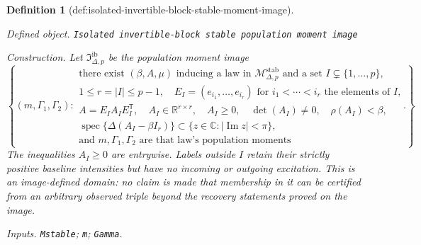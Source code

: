 \documentclass{article}
\newtheorem{definition}{Definition}
\begin{document}
\begin{definition}[def:isolated-invertible-block-stable-moment-image]\label{def:isolated-invertible-block-stable-moment-image}
\par\smallskip\noindent\emph{Defined object.} \texttt{Isolated invertible-\allowbreak{}block stable population moment image}
\par\smallskip\noindent\emph{Construction.} Let \(\mathfrak I_{\Delta,p}^{\mathrm{ib}}\) be the population moment image
\[
 \left\{(m,\Gamma_1,\Gamma_2):\begin{array}{l}
 \text{there exist }(\beta,A,\mu)\text{ inducing a law in }\mathcal M_{\Delta,p}^{\mathrm{stab}}\text{ and a set }I\subsetneq\{1,\ldots,p\},\\
 1\leq r=|I|\leq p-1,\quad E_I=(e_{i_1},\ldots,e_{i_r})\text{ for }i_1<\cdots<i_r\text{ the elements of }I,\\
 A=E_IA_IE_I^{\mathsf T},\quad A_I\in\mathbb R^{r\times r},\quad A_I\geq0,\quad \det(A_I)\neq0,\quad \rho(A_I)<\beta,\\
 \operatorname{spec}\{\Delta(A_I-\beta I_r)\}\subset\{z\in\mathbb C:|\operatorname{Im}z|<\pi\},\\
 \text{and }m,\Gamma_1,\Gamma_2\text{ are that law's population moments}
 \end{array}\right\}.
\]
The inequalities \(A_I\geq0\) are entrywise.  Labels outside \(I\) retain their strictly positive baseline intensities but have no incoming or outgoing excitation.  This is an image-defined domain: no claim is made that membership in it can be certified from an arbitrary observed triple beyond the recovery statements proved on the image.
\par\smallskip\noindent\emph{Inputs.} \texttt{Mstable}; \texttt{m}; \texttt{Gamma}.
\end{definition}
\end{document}
